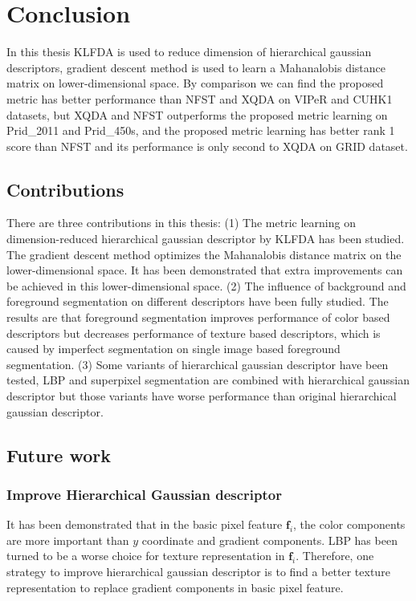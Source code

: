 
\chapter{Conclusion} %

In this thesis KLFDA is used to reduce dimension of hierarchical gaussian descriptors, gradient descent method is used to learn a Mahanalobis distance matrix on lower-dimensional space. By comparison we can find the proposed metric has better performance than NFST and XQDA on VIPeR and CUHK1 datasets, but XQDA and NFST outperforms the proposed metric learning on Prid\_2011 and Prid\_450s, and the proposed metric learning has better rank 1 score than NFST and its performance is only second to XQDA on GRID dataset. 
\section{Contributions}
There are three contributions in this thesis: (1) The metric learning on dimension-reduced hierarchical gaussian descriptor by KLFDA has been studied. The gradient descent method optimizes the Mahanalobis distance matrix on the lower-dimensional space. It has been demonstrated that extra improvements can be achieved in this lower-dimensional space. (2) The influence of background and foreground segmentation on different descriptors have been fully studied. The results are that foreground segmentation improves performance of color based descriptors but decreases performance of texture based descriptors, which is caused by imperfect segmentation on single image based foreground segmentation. (3) Some variants of hierarchical gaussian descriptor have been tested, LBP and superpixel segmentation are combined with hierarchical gaussian descriptor but those variants have worse performance than original hierarchical gaussian descriptor.
\section{Future work}
\subsection{Improve Hierarchical Gaussian descriptor}
It has been demonstrated that in the basic pixel feature $\bm{f}_i$, the color components are more important than $y$ coordinate and gradient components. LBP has been turned to be a worse choice for texture representation in $\bm{f}_i$. Therefore, one strategy to improve hierarchical gaussian descriptor is to find a better texture representation to replace gradient components in basic pixel feature. 

